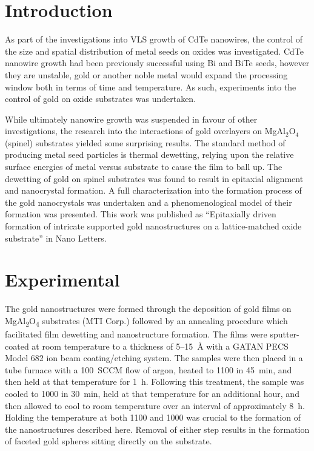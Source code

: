 \section{Introduction}
As part of the investigations into VLS growth of CdTe nanowires, the control of the size and spatial distribution of metal seeds on oxides was investigated.
CdTe nanowire growth had been previously successful using Bi and BiTe seeds, however they are unstable, gold or another noble metal would expand the processing window both in terms of time and temperature.
As such, experiments into the control of gold on oxide substrates was undertaken.

While ultimately nanowire growth was suspended in favour of other investigations, the research into the interactions of gold overlayers on MgAl\(_2\)O\(_4\) (spinel) substrates yielded some surprising results.
The standard method of producing metal seed particles is thermal dewetting, relying upon the relative surface energies of metal versus substrate to cause the film to ball up.
The dewetting of gold on spinel substrates was found to result in epitaxial alignment and nanocrystal formation.
A full characterization into the formation process of the gold nanocrystals was undertaken and a phenomenological model of their formation was presented.
This work was published as ``Epitaxially driven formation of intricate supported gold nanostructures
on a lattice-matched oxide substrate'' in Nano Letters\cite{Devenyi2009}.
\section{Experimental}
The gold nanostructures were formed through the deposition of gold films on MgAl\textsubscript{2}O\textsubscript{4} substrates (MTI Corp.) followed by an annealing procedure which facilitated film dewetting and nanostructure formation.
The films were sputter-coated at room temperature to a thickness of 5--15~\AA{} with a GATAN PECS Model 682 ion beam coating/etching system.
The samples were then placed in a tube furnace with a 100~SCCM flow of argon, heated to 1100\celsius{} in 45~min, and then held at that temperature for 1~h.
Following this treatment, the sample was cooled to 1000\celsius{} in 30~min, held at that temperature for an additional hour, and then allowed to cool to room temperature over an interval of approximately 8~h.
Holding the temperature at both 1100 and 1000\celsius{} was crucial to the formation of the nanostructures described here.
Removal of either step results in the formation of faceted gold spheres sitting directly on the substrate.

